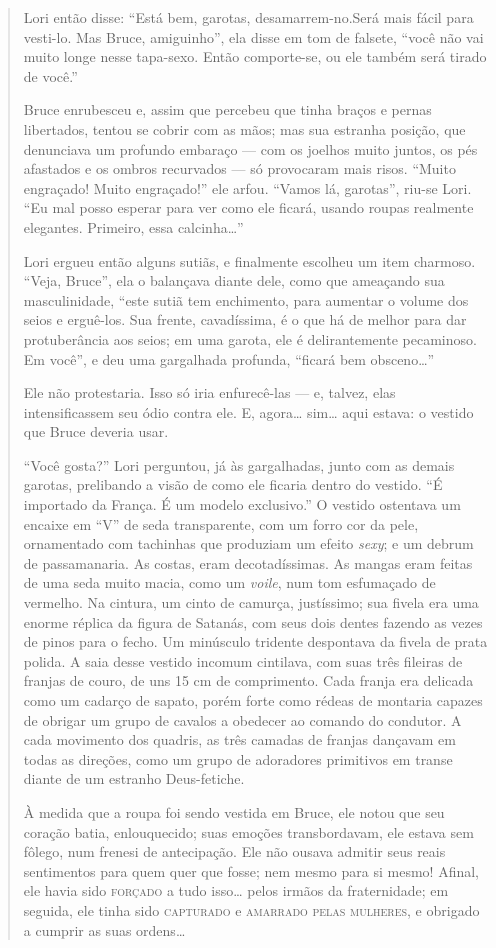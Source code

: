 \begin{quote}
Lori então disse: ``Está bem, garotas, desamarrem-no.\idxamarr[|)]
Será mais fácil para vesti-lo. Mas Bruce, amiguinho'', ela
disse em tom de falsete, ``você não vai muito longe nesse
tapa-sexo. Então comporte-se, ou ele também será tirado de
você.''

Bruce enrubesceu e, assim que percebeu que tinha braços e pernas
libertados, tentou se cobrir com as mãos; mas sua estranha posição,
que denunciava um profundo embaraço --- com os joelhos muito juntos,
os pés afastados e os ombros recurvados --- só provocaram mais risos.
``Muito engraçado! Muito engraçado!'' ele
arfou. ``Vamos lá, garotas'', riu-se Lori.
``Eu mal posso esperar para ver como ele ficará, usando
roupas realmente elegantes. Primeiro, essa calcinha\ldots{}''

Lori ergueu então alguns sutiãs, e finalmente escolheu um item
charmoso. ``Veja, Bruce'', ela o balançava
diante dele, como que ameaçando sua masculinidade, ``este
sutiã tem enchimento, para aumentar o volume dos seios e erguê-los. Sua
frente, cavadíssima, é o que há de melhor para dar protuberância aos
seios; em uma garota, ele é delirantemente pecaminoso. Em
você'', e deu uma gargalhada profunda,
``ficará bem obsceno\ldots{}''

Ele não protestaria. Isso só iria enfurecê-las --- e, talvez, elas
intensificassem seu ódio contra ele. E, agora\ldots{} sim\ldots{} aqui estava: o
vestido que Bruce deveria usar.

``Você gosta?'' Lori perguntou, já às
gargalhadas, junto com as demais garotas, prelibando a visão de como
ele ficaria dentro do vestido. ``É importado da França. É
um modelo exclusivo.'' O vestido ostentava um encaixe em
``V'' de seda transparente, com um forro cor
da pele, ornamentado com tachinhas que produziam um efeito
\textit{sexy}; e um debrum de passamanaria. As costas, eram
decotadíssimas. As mangas eram feitas de uma seda muito macia, como um
\textit{voile}, num tom esfumaçado de vermelho. Na cintura, um cinto de
camurça, justíssimo; sua fivela era uma enorme réplica da figura de
Satanás, com seus dois dentes fazendo as vezes de pinos para o fecho.
Um minúsculo tridente despontava da fivela de prata polida. A saia
desse vestido incomum cintilava, com suas três fileiras de franjas de
couro, de uns 15 cm de comprimento. Cada franja era delicada como um
cadarço de sapato, porém forte como rédeas de montaria capazes de
obrigar um grupo de cavalos a obedecer ao comando do condutor. A cada
movimento dos quadris, as três camadas de franjas dançavam em todas as
direções, como um grupo de adoradores primitivos em transe diante de
um estranho Deus-fetiche.

À medida que a roupa foi sendo vestida em Bruce, ele notou que seu
coração batia, enlouquecido; suas emoções transbordavam, ele estava sem
fôlego, num frenesi de antecipação. Ele não ousava admitir seus reais
sentimentos para quem quer que fosse; nem mesmo para si mesmo! Afinal,
ele havia sido \textsc{forçado} a tudo isso\ldots{} pelos irmãos da fraternidade; em
seguida, ele tinha sido \textsc{capturado} e \textsc{amarrado pelas mulheres}, e obrigado
a cumprir as suas ordens\ldots{}
\end{quote}

